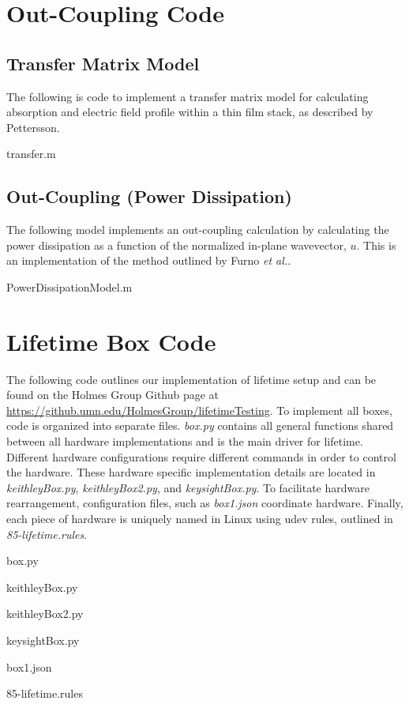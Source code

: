 \documentclass[../thesis.tex]{subfiles}
\begin{document}
\chapter{Out-Coupling Code}\label{sec:outCoupling_code}
\section{Transfer Matrix Model}
The following is code to implement a transfer matrix model for calculating absorption and electric field profile within a thin film stack, as described by Pettersson.\cite{Pettersson1999}

transfer.m


\section{Out-Coupling (Power Dissipation)}
The following model implements an out-coupling calculation by calculating the power dissipation as a function of the normalized in-plane wavevector, $u$.  
This is an implementation of the method outlined by Furno \textit{et al.}.\cite{Furno2010,Furno2012}

PowerDissipationModel.m


\chapter{Lifetime Box Code}\label{sec:lifetime_code}

The following code outlines our implementation of lifetime setup and can be found on the Holmes Group Github page at \url{https://github.umn.edu/HolmesGroup/lifetimeTesting}.
To implement all boxes, code is organized into separate files.
\textit{box.py} contains all general functions shared between all hardware implementations and is the main driver for lifetime.
Different hardware configurations require different commands in order to control the hardware.
These hardware specific implementation details are located in \textit{keithleyBox.py}, \textit{keithleyBox2.py}, and \textit{keysightBox.py}.
To facilitate hardware rearrangement, configuration files, such as \textit{box1.json} coordinate hardware.
Finally, each piece of hardware is uniquely named in Linux using udev rules, outlined in \textit{85-lifetime.rules}.

box.py
%

keithleyBox.py
%

keithleyBox2.py
%

keysightBox.py
%

box1.json
%

85-lifetime.rules
%



\end{document}
